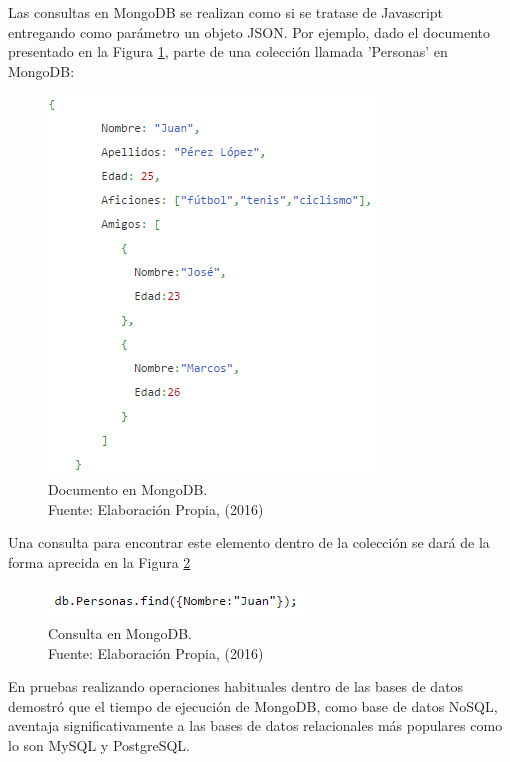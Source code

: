 Las consultas en MongoDB se realizan como si se tratase de Javascript entregando como parámetro un objeto JSON. Por ejemplo, dado el documento presentado en la Figura \ref{fig:MongoJsonExample}, parte de una colección llamada 'Personas' en MongoDB:

\begin{figure}[H]
	\centering
	\captionsetup{justification=centering}
	\includegraphics[scale=0.8]{images/MongoJsonExample.png}
	\caption[Documento en MongoDB.]{Documento en MongoDB.\\Fuente: Elaboración Propia, (2016)}
	\label{fig:MongoJsonExample}
\end{figure}

Una consulta para encontrar este elemento dentro de la colección se dará de la forma aprecida en la Figura \ref{fig:MongoJsonQueryExample}

\begin{figure}[H]
	\centering
	\captionsetup{justification=centering}
	\includegraphics[scale=0.8]{images/MongoJsonQueryExample.png}
	\caption[Consulta en MongoDB.]{Consulta en MongoDB.\\Fuente: Elaboración Propia, (2016)}
	\label{fig:MongoJsonQueryExample}
\end{figure}

En pruebas realizando operaciones habituales dentro de las bases de datos \cite{MongoPerformance} demostró que el tiempo de ejecución de MongoDB, como base de datos NoSQL, aventaja significativamente a las bases de datos relacionales más populares como lo son MySQL y PostgreSQL.

